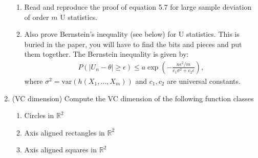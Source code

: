 \documentclass[11pt]{article}
\newcommand{\R}{\mathbb{R}}
\newcommand{\var}{\text{var}}
\begin{document}
\begin{enumerate}
 \begin{enumerate}
	\item Read and reproduce the proof of equation 5.7 for large sample deviation of order $m$ U statistics. 
	\item Also prove Bernstein's inequality (see below) for U statistics. This is buried in the paper, you will have to find the bits and pieces and put them together. The Bernstein inequality is given by:
	\begin{align*}
		P(|U_n-\theta|\geq \epsilon)\leq a\exp\left(-\frac{ n \epsilon^2/m}{c_1\sigma^2+c_2 \epsilon}\right),
	\end{align*}
	where $\sigma^2=\var(h(X_1,\dots,X_m))$ and $c_1,c_2$ are universal constants.
\end{enumerate}
 \item (VC dimension) Compute the VC dimension of the following function classes
\begin{enumerate}
	\item Circles in $\R^2$
	\item Axis aligned rectangles in $\R^2$
	\item Axis aligned squares in $\R^2$
\end{enumerate}
\end{enumerate}
\end{document}
